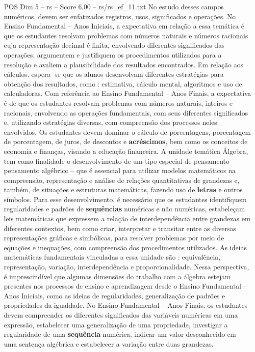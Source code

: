 \begin{textsample}{POS Dim 5 – rs – Score 6.00 – rs/rs\_ef\_11.txt}
No estudo desses campos numéricos, devem ser enfatizados registros, usos, significados e operações.
No Ensino Fundamental – Anos Iniciais, a expectativa em relação a essa temática é que os estudantes resolvam problemas com números naturais e números racionais cuja representação decimal é finita, envolvendo diferentes significados das operações, argumentem e justifiquem os procedimentos utilizados para a resolução e avaliem a plausibilidade dos resultados encontrados.
Em relação aos cálculos, espera -se que os alunos desenvolvam diferentes estratégias para obtenção dos resultados, como : estimativa, cálculo mental, algoritmos e uso de calculadoras.
Com referência ao Ensino Fundamental – Anos Finais, a expectativa é de que os estudantes resolvam problemas com números naturais, inteiros e racionais, envolvendo as operações fundamentais, com seus diferentes significados e, utilizando estratégias diversas, com compreensão dos processos neles envolvidos.
Os estudantes devem dominar o cálculo de porcentagens, porcentagem de porcentagem, de juros, de descontos e \textbf{acréscimos}, bem como os conceitos de economia e finanças, visando a educação financeira.
A unidade temática Álgebra, tem como finalidade o desenvolvimento de um tipo especial de pensamento – pensamento algébrico – que é essencial para utilizar modelos matemáticos na compreensão, representação e análise de relações quantitativas de grandezas e, também, de situações e estruturas matemáticas, fazendo uso de \textbf{letras} e outros símbolos.
Para esse desenvolvimento, é necessário que os estudantes identifiquem regularidades e padrões de \textbf{sequências} numéricas e não numéricas, estabeleçam leis matemáticas que expressem a relação de interdependência entre grandezas em diferentes contextos, bem como criar, interpretar e transitar entre as diversas representações gráficas e simbólicas, para resolver problemas por meio de equações e inequações, com compreensão dos procedimentos utilizados.
As ideias matemáticas fundamentais vinculadas a essa unidade são : equivalência, representação, variação, interdependência e proporcionalidade.
Nessa perspectiva, é imprescindível que algumas dimensões do trabalho com a álgebra estejam presentes nos processos de ensino e aprendizagem desde o Ensino Fundamental – Anos Iniciais, como as ideias de regularidades, generalização de padrões e propriedades da igualdade.
No Ensino Fundamental – Anos Finais, os estudantes devem compreender os diferentes significados das variáveis numéricas em uma expressão, estabelecer uma generalização de uma propriedade, investigar a regularidade de uma \textbf{sequência} numérica, indicar um valor desconhecido em uma sentença algébrica e estabelecer a variação entre duas grandezas.

\end{textsample}
